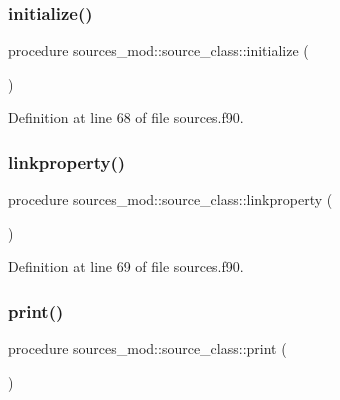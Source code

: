 \subsubsection{\texorpdfstring{initialize()}{initialize()}}
{\footnotesize\ttfamily procedure sources\+\_\+mod\+::source\+\_\+class\+::initialize (\begin{DoxyParamCaption}{ }\end{DoxyParamCaption})\hspace{0.3cm}{\ttfamily [private]}}



Definition at line 68 of file sources.\+f90.

\mbox{\label{structsources__mod_1_1source__class_a30cdd922a476d166a673c76c451bc381}} 
\subsubsection{\texorpdfstring{linkproperty()}{linkproperty()}}
{\footnotesize\ttfamily procedure sources\+\_\+mod\+::source\+\_\+class\+::linkproperty (\begin{DoxyParamCaption}{ }\end{DoxyParamCaption})\hspace{0.3cm}{\ttfamily [private]}}



Definition at line 69 of file sources.\+f90.

\mbox{\label{structsources__mod_1_1source__class_af632299e6c5e29a7f2008417aa68d529}} 
\subsubsection{\texorpdfstring{print()}{print()}}
{\footnotesize\ttfamily procedure sources\+\_\+mod\+::source\+\_\+class\+::print (\begin{DoxyParamCaption}{ }\end{DoxyParamCaption})\hspace{0.3cm}{\ttfamily [private]}}



